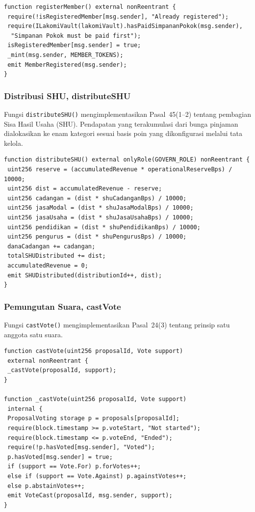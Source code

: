 \begin{lstlisting}
function registerMember() external nonReentrant {
 require(!isRegisteredMember[msg.sender], "Already registered");
 require(ILakomiVault(lakomiVault).hasPaidSimpananPokok(msg.sender),
  "Simpanan Pokok must be paid first");
 isRegisteredMember[msg.sender] = true;
 _mint(msg.sender, MEMBER_TOKENS);
 emit MemberRegistered(msg.sender);
}
\end{lstlisting}

\subsubsection{Distribusi SHU, distributeSHU}

Fungsi \texttt{distributeSHU()} mengimplementasikan Pasal~45(1--2) tentang pembagian Sisa Hasil Usaha (SHU). Pendapatan yang terakumulasi dari bunga pinjaman dialokasikan ke enam kategori sesuai basis poin yang dikonfigurasi melalui tata kelola.

\begin{lstlisting}
function distributeSHU() external onlyRole(GOVERN_ROLE) nonReentrant {
 uint256 reserve = (accumulatedRevenue * operationalReserveBps) / 10000;
 uint256 dist = accumulatedRevenue - reserve;
 uint256 cadangan = (dist * shuCadanganBps) / 10000;
 uint256 jasaModal = (dist * shuJasaModalBps) / 10000;
 uint256 jasaUsaha = (dist * shuJasaUsahaBps) / 10000;
 uint256 pendidikan = (dist * shuPendidikanBps) / 10000;
 uint256 pengurus = (dist * shuPengurusBps) / 10000;
 danaCadangan += cadangan;
 totalSHUDistributed += dist;
 accumulatedRevenue = 0;
 emit SHUDistributed(distributionId++, dist);
}
\end{lstlisting}

\subsubsection{Pemungutan Suara, castVote}

Fungsi \texttt{castVote()} mengimplementasikan Pasal~24(3) tentang prinsip satu anggota satu suara.

\begin{lstlisting}
function castVote(uint256 proposalId, Vote support) 
 external nonReentrant {
 _castVote(proposalId, support);
}

function _castVote(uint256 proposalId, Vote support) 
 internal {
 ProposalVoting storage p = proposals[proposalId];
 require(block.timestamp >= p.voteStart, "Not started");
 require(block.timestamp <= p.voteEnd, "Ended");
 require(!p.hasVoted[msg.sender], "Voted");
 p.hasVoted[msg.sender] = true;
 if (support == Vote.For) p.forVotes++;
 else if (support == Vote.Against) p.againstVotes++;
 else p.abstainVotes++;
 emit VoteCast(proposalId, msg.sender, support);
}
\end{lstlisting}

